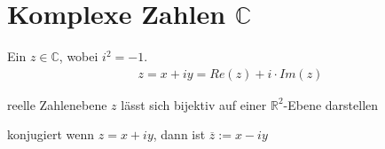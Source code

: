 \documentclass[a4paper]{article}
\begin{document}
\section{Komplexe Zahlen $\mathbb{C}$}
	\begin{multicols}{2}
		\begin{fdef}
			Ein $z \in \mathbb{C}$, wobei $i^2 = -1$. 
			\vspace{-3mm}
			\begin{align*}
			 	z = x + iy = Re(z) + i \cdot Im(z)
			\end{align*}
			\vspace{-7mm}
		\end{fdef}
		\begin{desc_compact}
			\item[reelle Zahlenebene] $z$ lässt sich bijektiv auf einer
					$\mathbb{R}^2$-Ebene darstellen
			\item[konjugiert] wenn $z = x + iy$, dann ist $\overline{z} := x - iy$
		\end{desc_compact}
	\end{multicols}
\end{document}
